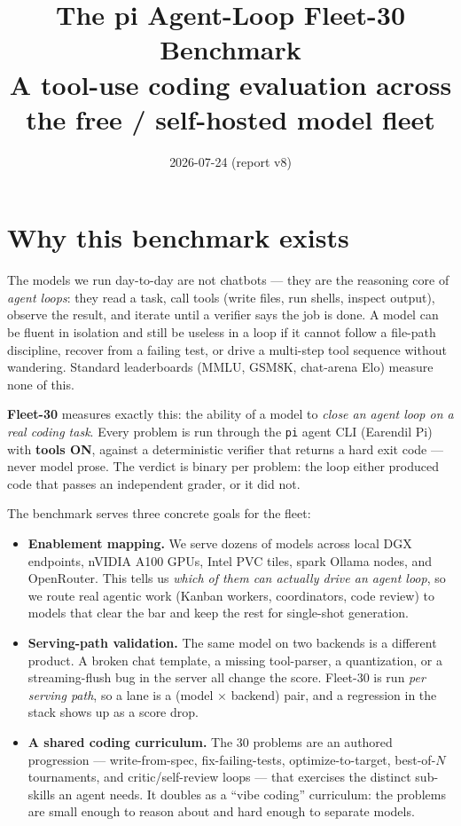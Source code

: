 \documentclass[11pt]{article}
\title{\vspace{-1.5em}\textbf{The pi Agent-Loop Fleet-30 Benchmark}\\[0.3em]
\large A tool-use coding evaluation across the free / self-hosted model fleet}
\author{}
\date{2026-07-24 \quad (report v8)}
\begin{document}
\maketitle
\thispagestyle{fancy}
\vspace{-2.5em}

\section{Why this benchmark exists}

The models we run day-to-day are not chatbots --- they are the reasoning core of
\emph{agent loops}: they read a task, call tools (write files, run shells, inspect
output), observe the result, and iterate until a verifier says the job is done. A
model can be fluent in isolation and still be useless in a loop if it cannot follow a
file-path discipline, recover from a failing test, or drive a multi-step tool
sequence without wandering. Standard leaderboards (MMLU, GSM8K, chat-arena Elo)
measure none of this.

\textbf{Fleet-30} measures exactly this: the ability of a model to \emph{close an
agent loop on a real coding task}. Every problem is run through the \texttt{pi} agent
CLI (Earendil Pi) with \textbf{tools ON}, against a deterministic verifier that
returns a hard exit code --- never model prose. The verdict is binary per problem:
the loop either produced code that passes an independent grader, or it did not.

The benchmark serves three concrete goals for the fleet:

\begin{itemize}
\item \textbf{Enablement mapping.} We serve dozens of models across local DGX
  endpoints, nVIDIA A100 GPUs, Intel PVC tiles, spark Ollama nodes, and OpenRouter. This
  tells us \emph{which of them can actually drive an agent loop}, so we route real
  agentic work (Kanban workers, coordinators, code review) to models that clear the
  bar and keep the rest for single-shot generation.
\item \textbf{Serving-path validation.} The same model on two backends is a
  different product. A broken chat template, a missing tool-parser, a quantization,
  or a streaming-flush bug in the server all change the score. Fleet-30 is run
  \emph{per serving path}, so a lane is a (model $\times$ backend) pair, and a
  regression in the stack shows up as a score drop.
\item \textbf{A shared coding curriculum.} The 30 problems are an authored
  progression --- write-from-spec, fix-failing-tests, optimize-to-target,
  best-of-$N$ tournaments, and critic/self-review loops --- that exercises the
  distinct sub-skills an agent needs. It doubles as a ``vibe coding'' curriculum:
  the problems are small enough to reason about and hard enough to separate models.
\end{itemize}
\end{document}

